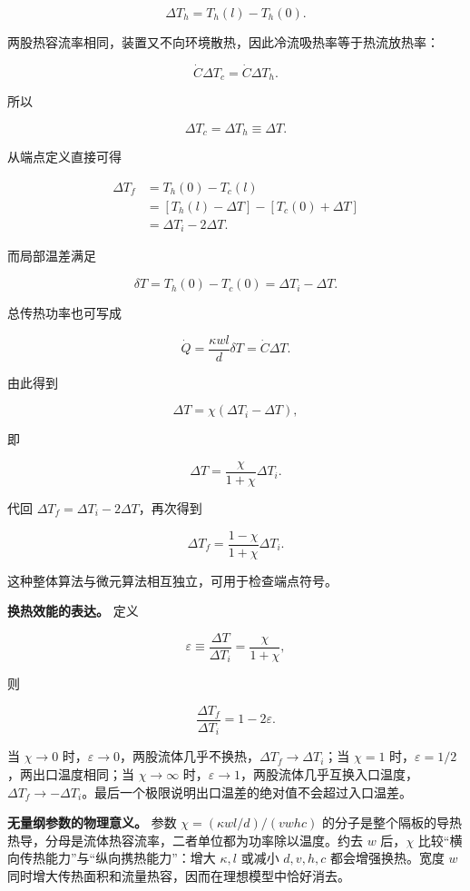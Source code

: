 \documentclass[12pt,a4paper,UTF8]{ctexart}
\begin{document}
\[
\Delta T_h=T_h(l)-T_h(0).
\]

两股热容流率相同，装置又不向环境散热，因此冷流吸热率等于热流放热率：

\[
\dot C\Delta T_c=\dot C\Delta T_h.
\]

所以

\[
\Delta T_c=\Delta T_h\equiv\Delta T.
\]

从端点定义直接可得

\[
\begin{aligned}
\Delta T_f
&=T_h(0)-T_c(l)\\
&=[T_h(l)-\Delta T]-[T_c(0)+\Delta T]\\
&=\Delta T_i-2\Delta T.
\end{aligned}
\]

而局部温差满足

\[
\delta T=T_h(0)-T_c(0)=\Delta T_i-\Delta T.
\]

总传热功率也可写成

\[
\dot Q=\frac{\kappa wl}{d}\delta T
=\dot C\Delta T.
\]

由此得到

\[
\Delta T=\chi(\Delta T_i-\Delta T),
\]

即

\[
\Delta T=\frac{\chi}{1+\chi}\Delta T_i.
\]

代回 \(\Delta T_f=\Delta T_i-2\Delta T\)，再次得到

\[
\Delta T_f=\frac{1-\chi}{1+\chi}\Delta T_i.
\]

这种整体算法与微元算法相互独立，可用于检查端点符号。

\textbf{换热效能的表达。} 定义

\[
\varepsilon\equiv\frac{\Delta T}{\Delta T_i}
=\frac{\chi}{1+\chi},
\]

则

\[
\frac{\Delta T_f}{\Delta T_i}=1-2\varepsilon.
\]

当 \(\chi\to0\)
时，\(\varepsilon\to0\)，两股流体几乎不换热，\(\Delta T_f\to\Delta T_i\)；当
\(\chi=1\) 时，\(\varepsilon=1/2\)，两出口温度相同；当 \(\chi\to\infty\)
时，\(\varepsilon\to1\)，两股流体几乎互换入口温度，\(\Delta T_f\to-\Delta T_i\)。最后一个极限说明出口温差的绝对值不会超过入口温差。

\textbf{无量纲参数的物理意义。} 参数 \(\chi=(\kappa wl/d)/(vwhc)\)
的分子是整个隔板的导热热导，分母是流体热容流率，二者单位都为功率除以温度。约去
\(w\) 后，\(\chi\) 比较``横向传热能力''与``纵向携热能力''：增大
\(\kappa,l\) 或减小 \(d,v,h,c\) 都会增强换热。宽度 \(w\)
同时增大传热面积和流量热容，因而在理想模型中恰好消去。
\end{document}
